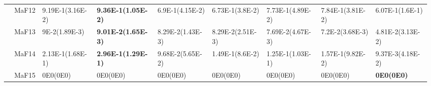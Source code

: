 \documentclass[]{article}
\begin{document}
\begin{landscape}
\begin{table}
\begin{footnotesize}
\begin{tabular}{|l|l|l|l|l|l|l|l|l|}
 & MaF12 & \cellcolor{gray95} 9.19E-1(3.16E-2) & \cellcolor{gray95} {\bf 9.36E-1(1.05E-2)} & 6.9E-1(4.15E-2) & 6.73E-1(3.8E-2) & 7.73E-1(4.89E-2) & 7.84E-1(3.81E-2) & 6.07E-1(1.6E-1)\\
 & MaF13 & \cellcolor{gray95} 9E-2(1.89E-3) & \cellcolor{gray95} {\bf 9.01E-2(1.65E-3)} & 8.29E-2(1.43E-3) & 8.29E-2(2.51E-3) & 7.69E-2(4.67E-3) & 7.2E-2(3.68E-3) & 4.81E-2(3.13E-2)\\
 & MaF14 & \cellcolor{gray95} 2.13E-1(1.68E-1) & \cellcolor{gray95} {\bf 2.96E-1(1.29E-1)} & 9.68E-2(5.65E-2) & \cellcolor{gray95} 1.49E-1(8.6E-2) & 1.25E-1(1.03E-1) & \cellcolor{gray95} 1.57E-1(9.82E-2) & 9.37E-3(4.18E-2)\\
 & MaF15 & \cellcolor{gray95} 0E0(0E0) & \cellcolor{gray95} 0E0(0E0) & \cellcolor{gray95} 0E0(0E0) & \cellcolor{gray95} 0E0(0E0) & \cellcolor{gray95} 0E0(0E0) & \cellcolor{gray95} 0E0(0E0) & \cellcolor{gray95} {\bf 0E0(0E0)}\\
\hline
\end{tabular}
\end{footnotesize}
\end{table}
\end{landscape}
\end{document}
